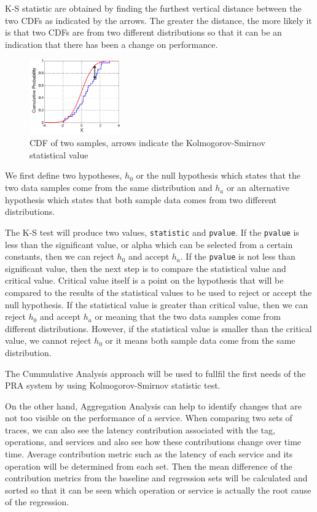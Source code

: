 \documentclass[conference]{configs/IEEEtran}
\begin{document}
K-S statistic are obtained by finding the furthest vertical distance between the two CDFs as indicated by the arrows. The greater the distance, the more likely it is that two CDFs are from two different distributions so that it can be an indication that there has been a change on performance.
\begin{figure}[htb]
	\centering
	\includegraphics[width=0.35\textwidth]{resources/ch2/ks.png}
	\caption{CDF of two samples, arrows indicate the Kolmogorov-Smirnov statistical value \cite{wiki:ks-test}}
	\label{ks-example}
\end{figure}

We first define two hypotheses, $h_{0}$ or the null hypothesis which states that the two data samples come from the same distribution and $h_{a}$ or an alternative hypothesis which states that both sample data comes from two different distributions.

The K-S test will produce two values, \texttt{statistic} and \texttt{pvalue}. If the \texttt{pvalue} is less than the significant value, or alpha which can be selected from a certain constants,
then we can reject $h_{0}$ and accept $h_{a}$. If the \texttt{pvalue} is not less than significant value, then the next step is to compare the statistical value and critical value. Critical value itself is a point on the hypothesis that will be compared to the results of the statistical values to be used to reject or accept the null hypothesis. If the statistical value is greater than critical value, then we can reject $h_{0}$ and accept $h_{a}$ or meaning that the two data samples come from different distributions. However, if the statistical value is smaller than the critical value, we cannot reject $h_{0}$ or it means both sample data come from the same distribution.

The Cummulative Analysis approach will be used to fullfil the first needs of the PRA system by using Kolmogorov-Smirnov statistic test.

On the other hand, Aggregation Analysis can help to identify changes that are not too visible on the performance of a service. When comparing two sets of traces, we can also see the latency contribution associated with the tag,
operations, and services and also see how these contributions change over time time. Average contribution metric
such as the latency of each service and its operation will be determined from each set. Then the mean difference of the contribution metrics from the baseline and regression sets
will be calculated and sorted so that it can be seen which operation or service is actually the root cause of the regression.
\end{document}
